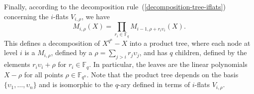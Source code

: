 \documentclass{article}
\newcommand{\ff}[1]{\mathbb{F}_{#1}}
\newcommand{\qq}{q}
\newcommand{\nn}{n}
\newcommand{\qn}{{\qq^\nn}}
\newcommand{\basef}{\ff{\qq}}
\newcommand{\extf}{\ff{\qn}}
\begin{document}
Finally, according to the decomposition rule~(\ref{decomposition-tree-iflats}) concerning the $i$-flats $V_{i,\rho}$, we have
\begin{equation}
\label{node_product}
  M_{i,\rho}(X) = \prod_{r_i\in\basef} M_{i-1,\rho+r_i\upsilon_i}(X).
\end{equation}
This defines a decomposition of $X^{\qn}-X$ into a product tree, where
each node at level $i$ is a $M_{i,\rho}$, defined by a
$\rho=\sum_{j>i}r_j\upsilon_j$, and has $\qq$ children, defined by
the elements $r_i\upsilon_{i}+\rho$ for $r_i \in\basef$. In particular,
the leaves are the linear polynomials $X-\rho$ for all points
$\rho\in\extf$.
%
Note that the product tree depends on the basis $\{\upsilon_1,\ldots,\upsilon_\nn\}$ and is isomorphic to the $q$-ary defined in terms of $i$-flats $V_{i,\rho}$.


\end{document}
